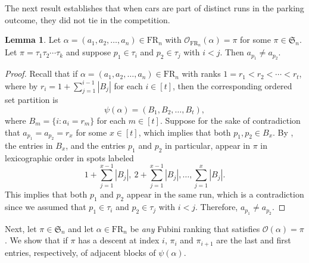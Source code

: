 \documentclass{amsart}
\theoremstyle{definition}
\newtheorem{lemma}{Lemma}[section]
\theoremstyle{definition}
\theoremstyle{remark}
\newcommand{\FR}[1]{\mathrm{FR}_{#1}}
\newcommand{\out}{\mathcal{O}}
\newcommand{\Sym}{\mathfrak{S}}
\begin{document}
The next result establishes that when cars are part of distinct runs in the parking outcome, they did not tie in the competition.  
\begin{lemma}\label{lemma: ties do not break over runs}
    Let $\alpha=(a_1,a_2,\ldots,a_n)\in\FR{n}$ with $\out_{\FR{n}}(\alpha)=\pi$ for some $\pi\in\mathfrak{S}_n$. Let $\pi=\tau_1\tau_2\cdots\tau_k$ and suppose $p_1\in\tau_i$ and $p_2\in\tau_j$ with $i<j$. Then $a_{p_1}\neq a_{p_2}$. 
\end{lemma}
\begin{proof} 
    Recall that if $\alpha=(a_1,a_2,\ldots,a_n)\in\FR{n}$ with ranks $1=r_1<r_2<\cdots<r_t$, where by  $r_i=1+\sum_{j=1}^{i-1}|B_j|$ for each $i\in[t]$, then the corresponding ordered set partition is
    \[\psi(\alpha)=(B_1,B_2,\ldots,B_t),\]
    where $B_m=\{i:a_i=r_m\}$ for each $m\in[t]$.
    Suppose for the sake of contradiction that $a_{p_1}=a_{p_2}=r_x$ for some $x\in [t]$, which implies that both $p_1,p_2\in B_x$. By , the entries in $B_x$, and the entries $p_1$ and $p_2$ in particular, appear in $\pi$ in lexicographic order in spots labeled 
    \[1+\sum_{j=1}^{x-1}|B_j|, ~2 + \sum_{j=1}^{x-1}|B_j|, \ldots, \sum_{j=1}^{x}|B_j|. \]
    This implies that both $p_1$ and $p_2$ appear in the same run, which is a contradiction since we assumed that $p_1\in\tau_i$ and $p_2\in\tau_j$ with $i<j$. 
    Therefore, $a_{p_1}\neq a_{p_2}$.
\end{proof} 

Next, let $\pi \in \Sym_n$ and let $\alpha \in \FR{n}$ be \textit{any} Fubini ranking that satisfies $\out(\alpha)=\pi$. We show that if $\pi$ has a descent at index $i$, $\pi_{i}$ and $\pi_{i+1}$ are the last and first entries, respectively, of adjacent blocks of $\psi(\alpha)$. 
\end{document}

